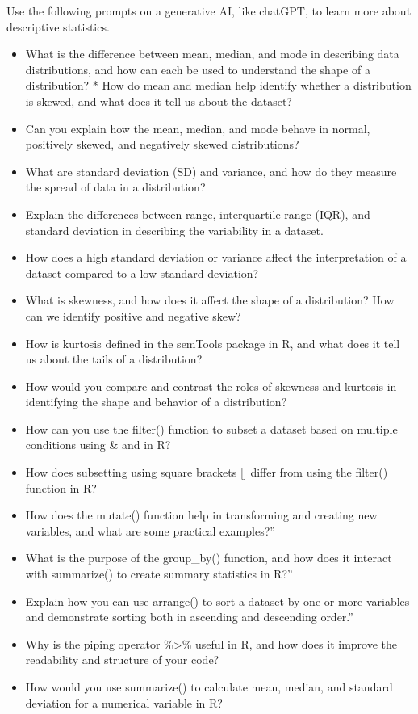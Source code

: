 \documentclass[
  letterpaper,
  DIV=11,
  numbers=noendperiod]{scrreprt}
\begin{document}
Use the following prompts on a generative AI, like chatGPT, to learn
more about descriptive statistics.

\begin{itemize}
\item
  What is the difference between mean, median, and mode in describing
  data distributions, and how can each be used to understand the shape
  of a distribution? * How do mean and median help identify whether a
  distribution is skewed, and what does it tell us about the dataset?
\item
  Can you explain how the mean, median, and mode behave in normal,
  positively skewed, and negatively skewed distributions?
\item
  What are standard deviation (SD) and variance, and how do they measure
  the spread of data in a distribution?
\item
  Explain the differences between range, interquartile range (IQR), and
  standard deviation in describing the variability in a dataset.
\item
  How does a high standard deviation or variance affect the
  interpretation of a dataset compared to a low standard deviation?
\item
  What is skewness, and how does it affect the shape of a distribution?
  How can we identify positive and negative skew?
\item
  How is kurtosis defined in the semTools package in R, and what does it
  tell us about the tails of a distribution?
\item
  How would you compare and contrast the roles of skewness and kurtosis
  in identifying the shape and behavior of a distribution?
\item
  How can you use the filter() function to subset a dataset based on
  multiple conditions using \& and \textbar{} in R?
\item
  How does subsetting using square brackets {[}{]} differ from using the
  filter() function in R?
\item
  How does the mutate() function help in transforming and creating new
  variables, and what are some practical examples?''
\item
  What is the purpose of the group\_by() function, and how does it
  interact with summarize() to create summary statistics in R?''
\item
  Explain how you can use arrange() to sort a dataset by one or more
  variables and demonstrate sorting both in ascending and descending
  order.''
\item
  Why is the piping operator \%\textgreater\% useful in R, and how does
  it improve the readability and structure of your code?
\item
  How would you use summarize() to calculate mean, median, and standard
  deviation for a numerical variable in R?
\end{itemize}
\end{document}
